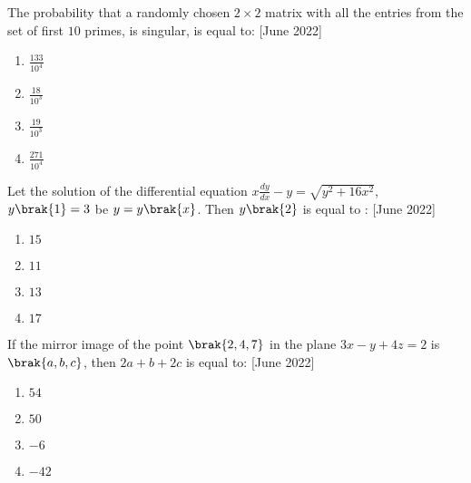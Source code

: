 \iffalse
\title{assignment}
\author{ee24btech11064}
\section{mcq-single}
\fi

\item The probability that a randomly chosen $2\times 2$ matrix with all the entries from the set of first $10$ primes, is singular, is equal to: \hfill[June 2022]
\begin{multicols}{2}
\begin{enumerate}
    \item $\frac{133}{10^4}$
    \item $\frac{18}{10^3}$
    \item $\frac{19}{10^3}$
    \item $\frac{271}{10^4}$ 
\end{enumerate}
\end{multicols}

\item Let the solution of the differential equation $x\frac{dy}{dx}-y=\sqrt{y^2+16x^2}$, $y\brak{1}=3$ be $y=y\brak{x}$. Then $y\brak{2}$ is equal to : \hfill[June 2022]
\begin{multicols}{2}
\begin{enumerate}
    \item $15$
    \item $11$
    \item $13$
    \item $17$
\end{enumerate}
\end{multicols}
\item If the mirror image of the point $\brak{2,4,7}$ in the plane $3x-y+4z=2$ is $\brak{a,b,c}$, then $2a+b+2c$ is equal to: \hfill[June 2022]
\begin{multicols}{2}
\begin{enumerate}
       \item $54$
       \item $50$
       \item $-6$
       \item $-42$
\end{enumerate}
\end{multicols}

